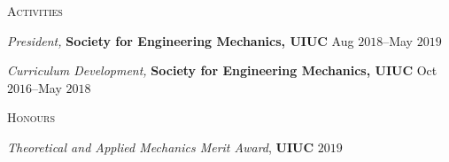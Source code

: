 \documentclass[10pt]{article}
\begin{document}
\begin{multicols}{2}
\textsc{Activities}
\columnbreak

\textit{President,} \textbf{Society for Engineering Mechanics, UIUC} \hfill Aug $2018$--May $2019$

\vspace{-0.75em}

%
\textit{Curriculum Development,} \textbf{Society for Engineering Mechanics, UIUC} \hfill Oct $2016$--May $2018$

%
\end{multicols}
\vspace{-1.5em} 
\begin{multicols}{2}
\textsc{Honours}
\columnbreak

\textit{Theoretical and Applied Mechanics Merit Award}, \textbf{UIUC} \hfill $2019$


\end{multicols}
\end{document}
